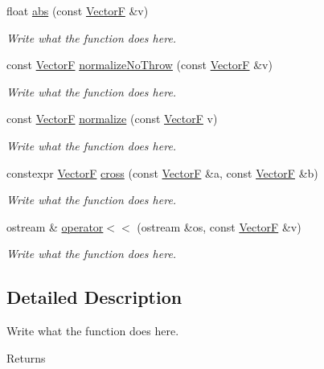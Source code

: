 \begin{DoxyCompactItemize}
float \hyperlink{structVectorF_a34fe870a7141fd569c7144399f50c9a4}{abs} (const \hyperlink{structVectorF}{Vector\+F} \&v)
\begin{DoxyCompactList}\small\item\em Write what the function does here. \end{DoxyCompactList}\item 
const \hyperlink{structVectorF}{Vector\+F} \hyperlink{structVectorF_ac72c1e0aeaabb3f1b9749c409db9114a}{normalize\+No\+Throw} (const \hyperlink{structVectorF}{Vector\+F} \&v)
\begin{DoxyCompactList}\small\item\em Write what the function does here. \end{DoxyCompactList}\item 
const \hyperlink{structVectorF}{Vector\+F} \hyperlink{structVectorF_a97332544d415a8540da3caea6581c52d}{normalize} (const \hyperlink{structVectorF}{Vector\+F} v)
\begin{DoxyCompactList}\small\item\em Write what the function does here. \end{DoxyCompactList}\item 
constexpr \hyperlink{structVectorF}{Vector\+F} \hyperlink{structVectorF_a968c41313af492c22f946584e83fb9f5}{cross} (const \hyperlink{structVectorF}{Vector\+F} \&a, const \hyperlink{structVectorF}{Vector\+F} \&b)
\begin{DoxyCompactList}\small\item\em Write what the function does here. \end{DoxyCompactList}\item 
ostream \& \hyperlink{structVectorF_a2e9914517f8e728e8e4e735cc09e19a2}{operator$<$$<$} (ostream \&os, const \hyperlink{structVectorF}{Vector\+F} \&v)
\begin{DoxyCompactList}\small\item\em Write what the function does here. \end{DoxyCompactList}\end{DoxyCompactItemize}


\subsection{Detailed Description}
Write what the function does here. 

\begin{DoxyReturn}{Returns}

\end{DoxyReturn}


